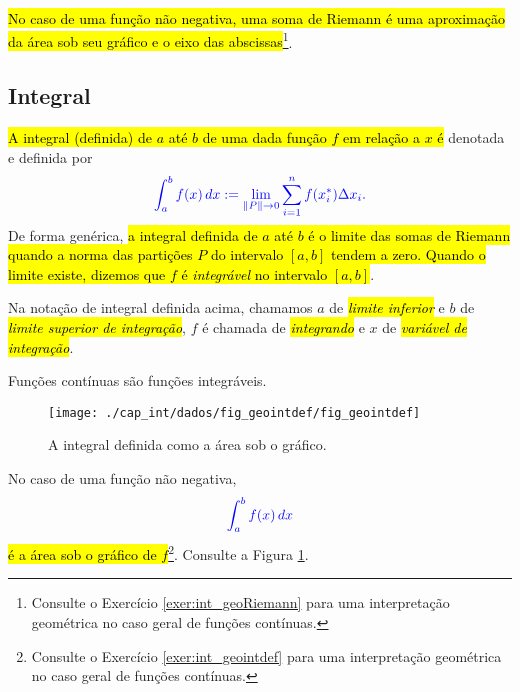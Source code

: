 \hl{No caso de uma função não negativa, uma soma de Riemann é uma aproximação da área sob seu gráfico e o eixo das abscissas}\footnote{Consulte o Exercício \ref{exer:int_geoRiemann} para uma interpretação geométrica no caso geral de funções contínuas.}. 

\subsection{Integral}

\hl{A integral (definida) de $a$ até $b$ de uma dada função $f$ em relação a $x$ é} denotada e definida por
\begin{equation}\color{blue}\int_a^b f(x)\,dx := \lim_{\|P\|\to 0} \sum_{i=1}^n f(x_i^*)\Delta x_i.
\end{equation}
De forma genérica, \hl{a integral definida de $a$ até $b$ é o limite das somas de Riemann quando a norma das partições $P$ do intervalo $[a, b]$ tendem a zero. Quando o limite existe, dizemos que $f$ é \emph{integrável} no intervalo $[a, b]$}.

Na notação de integral definida acima, chamamos $a$ de \hl{\emph{limite inferior}} e $b$ de \hl{\emph{limite superior de integração}}, $f$ é chamada de \hl{\emph{integrando}} e $x$ de \hl{\emph{variável de integração}}.

\begin{obs}
  Funções contínuas são funções integráveis.
\end{obs}

\begin{figure}[H]
  \centering
  \texttt{[image: ./cap\_int/dados/fig\_geointdef/fig\_geointdef]}
  \caption{A integral definida como a área sob o gráfico.}
  \label{fig:geointdef}
\end{figure}

\begin{obs}\label{obs:int_area}
  No caso de uma função não negativa,
  \begin{equation}\color{blue}\int_a^b f(x)\,dx
  \end{equation}
  \hl{é a área sob o gráfico de $f$}\footnote{Consulte o Exercício \ref{exer:int_geointdef} para uma interpretação geométrica no caso geral de funções contínuas.}. Consulte a Figura \ref{fig:geointdef}.  
\end{obs}

